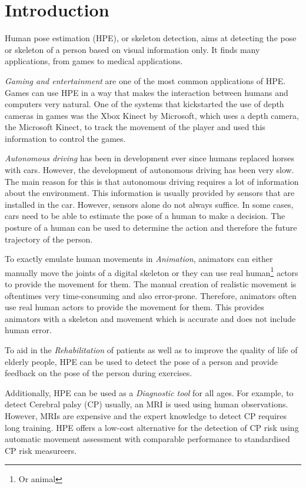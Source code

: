 \chapter{Introduction}
\setcounter{page}{1}
Human pose estimation (HPE), or skeleton detection, aims at detecting the pose or skeleton of a person based on visual information only. It finds many applications, from games to medical applications\cite{kumarapu2020animepose, ClinicalApplicationChen, MedicalAnimation}. 

\textit{Gaming and entertainment} are one of the most common applications of HPE. Games can use HPE in a way that makes the interaction between humans and computers very natural. One of the systems that kickstarted the use of depth cameras in games was the Xbox Kinect by Microsoft, which uses a depth camera, the Microsoft Kinect, to track the movement of the player and used this information to control the games.

\textit{Autonomous driving} has been in development ever since humans replaced horses with cars\cite{OldAutoDrive}. However, the development of autonomous driving has been very slow. The main reason for this is that autonomous driving requires a lot of information about the environment. This information is usually provided by sensors that are installed in the car. However, sensors alone do not always suffice. In some cases, cars need to be able to estimate the pose of a human to make a decision. The posture of a human can be used to determine the action and therefore the future trajectory of the person. 

To exactly emulate human movements in \textit{Animation}, animators can either manually move the joints of a digital skeleton or they can use real human\footnote{Or animal} actors to provide the movement for them. The manual creation of realistic movement is oftentimes very time-consuming and also error-prone. Therefore, animators often use real human actors to provide the movement for them. This provides animators with a skeleton and movement which is accurate and does not include human error.

To aid in the \textit{Rehabilitation} of patients as well as to improve the quality of life of elderly people, HPE can be used to detect the pose of a person and provide feedback on the pose of the person during exercises\cite{ClinicalApplicationChen}. 

Additionally, HPE can be used as a \textit{Diagnostic tool} for all ages. For example, to detect Cerebral palsy (CP) usually, an MRI is used using human observations. However, MRIs are expensive and the expert knowledge to detect CP requires long training. HPE offers a low-cost alternative for the detection of CP risk using automatic movement assessment with comparable performance to standardised CP risk measureers\cite{Stenum2021ApplicationsOP}.

